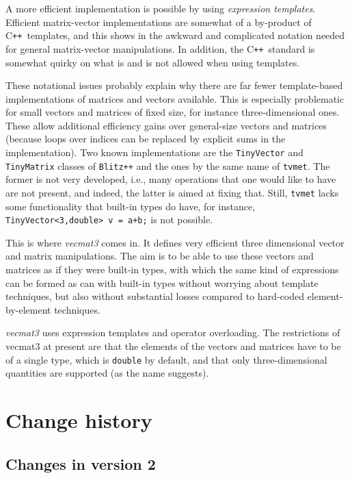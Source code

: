 \documentclass[12pt,twoside]{article}
\newcommand{\cxx}{C\texttt{++}}
\begin{document}
A more efficient implementation is possible by using \emph{expression
templates}.  Efficient matrix-vector implementations are somewhat of a
by-product of \cxx\ templates, and this shows in the awkward and
complicated notation needed for general matrix-vector
manipulations. In addition, the \cxx\ standard is somewhat quirky on
what is and is not allowed when using templates.

These notational issues probably explain why there are far fewer
template-based implementations of matrices and vectors available.
This is especially problematic for small vectors and matrices of fixed
size, for instance three-dimensional ones. These allow additional
efficiency gains over general-size vectors and matrices (because loops
over indices can be replaced by explicit sums in the implementation).
Two known implementations are the \texttt{TinyVector} and \texttt{
TinyMatrix} classes of \texttt{Blitz++} and the ones by the same name of
\texttt{tvmet}. The former is not very developed, i.e., many operations
that one would like to have are not present, and indeed, the latter is
aimed at fixing that. Still, \texttt{tvmet} lacks some functionality that
built-in types do have, for instance, \texttt{TinyVector<3,double> v =
a+b;} is not possible.

This is where \emph{vecmat3} comes in. It defines very efficient
three dimensional vector and matrix manipulations.  The aim is to be
able to use these vectors and matrices as if they were built-in types,
with which the same kind of expressions can be formed as can with
built-in types without worrying about template techniques, but also without
substantial losses compared to hard-coded element-by-element
techniques.

\emph{vecmat3} uses expression templates and operator
overloading. The restrictions of vecmat3 at present are that the
elements of the vectors and matrices have to be of a single type,
which is \texttt{double} by default, and that only three-dimensional
quantities are supported (as the name suggests).

\section*{Change history}
\subsection*{Changes in version 2}
\end{document}
